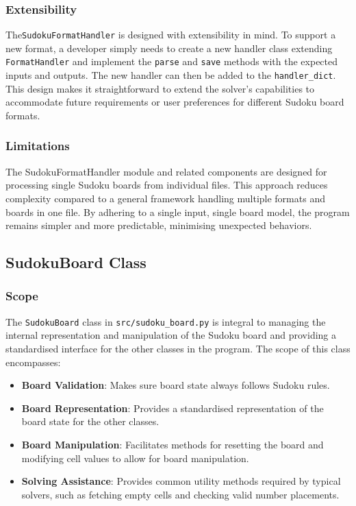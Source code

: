 \documentclass[11pt]{article}
\begin{document}
\subsubsection{Extensibility}
The\texttt{SudokuFormatHandler} is designed with extensibility in mind. To support a new format, a developer simply needs to create a new handler class extending \texttt{FormatHandler} and implement the \texttt{parse} and \texttt{save} methods with the expected inputs and outputs. The new handler can then be added to the \texttt{handler\_dict}. This design makes it straightforward to extend the solver's capabilities to accommodate future requirements or user preferences for different Sudoku board formats.


\subsubsection{Limitations}
The SudokuFormatHandler module and related components are designed for processing single Sudoku boards from individual files. This approach reduces complexity compared to a general framework handling multiple formats and boards in one file. By adhering to a single input, single board model, the program remains simpler and more predictable, minimising unexpected behaviors.

\subsection{SudokuBoard Class}

\subsubsection{Scope}
The \texttt{SudokuBoard} class in \texttt{src/sudoku\_board.py} is integral to managing the internal representation and manipulation of the Sudoku board and providing a standardised interface for the other classes in the program. The scope of this class encompasses:

\begin{itemize}
    \item \textbf{Board Validation}: Makes sure board state always follows Sudoku rules. 
    \item \textbf{Board Representation}: Provides a standardised representation of the board state for the other classes. 
    \item \textbf{Board Manipulation}: Facilitates methods for resetting the board and modifying cell values to allow for board manipulation.
    \item \textbf{Solving Assistance}: Provides common utility methods required by typical solvers, such as fetching empty cells and checking valid number placements.

\end{itemize}
\end{document}
